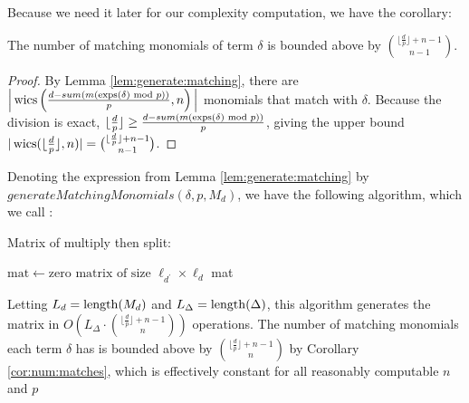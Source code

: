 Because we need it later for our complexity computation, we have the corollary:

\begin{cor}
    \label{cor:num:matches}
    The number of matching monomials of term $\delta$ is 
    bounded above by $\binom{\lfloor \frac{d}{p} \rfloor + n - 1}{n - 1}$.
\end{cor}

\begin{proof}
    By Lemma \ref{lem:generate:matching}, there are 
    $\Big |\operatorname{wics} \left(\frac{d - sum(m(\operatorname{exps}(\delta) \text{ mod } p))}{p}, n \right) \Big |$ 
    monomials that match with $\delta$.
    Because the division is exact, 
    $\lfloor \frac{d}{p} \rfloor \geq \frac{d - sum(m(\operatorname{exps}(\delta) \text{ mod } p))}{p}$,
    giving the upper bound 
    $|\operatorname{wics}(\lfloor \frac{d}{p} \rfloor, n)| = \binom{\lfloor \frac{d}{p} \rfloor + n - 1}{n - 1}$.
\end{proof}

Denoting the expression from Lemma \ref{lem:generate:matching} 
by $generateMatchingMonomials(\delta, p, M_d)$, we have
the following algorithm, which we call \wicsalg:

\begin{algorithm}[H]
    \caption{Matrix of multiply then split: \wicsalg}
    $\text{mat} \gets \text{zero matrix of size } \ell_{d^\prime} \times \ell_d $\;
    \Return mat
    \label{alg:matrix:WICS}
\end{algorithm}

Letting $L_{d} = \operatorname{length}(M_d)$ and 
$L_{\Delta} = \operatorname{length}(\Delta)$, this algorithm 
generates the matrix in 
$O \left( L_{\Delta} \cdot \binom{\lfloor \frac{d}{p} \rfloor + n - 1}{n} \right)$ operations.
The number of matching monomials each term $\delta$ 
has is bounded above by $\binom{\lfloor \frac{d}{p} \rfloor + n - 1}{n}$ 
by Corollary \ref{cor:num:matches}, which is 
effectively constant for all reasonably computable $n$ and $p$

